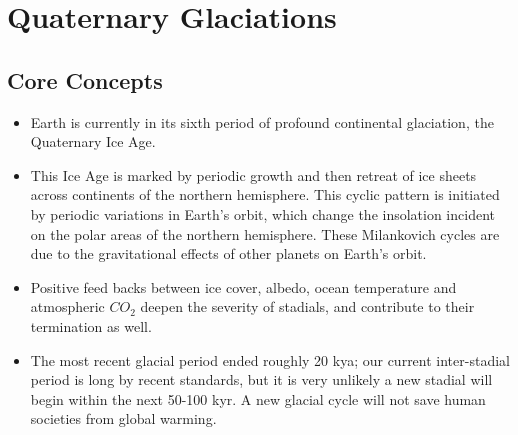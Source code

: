 \chapter{Quaternary Glaciations}\label{chap:Ice_Ages}

\section{Core Concepts}
\begin{itemize}
	\item	Earth is currently in its sixth period of profound continental glaciation, the Quaternary Ice Age.  
	\item This Ice Age is marked by periodic growth and then retreat of ice sheets across continents of the northern hemisphere. This cyclic pattern is initiated by periodic variations in Earth's orbit, which change the insolation incident on the polar areas of the northern hemisphere. These Milankovich cycles are due to the gravitational effects of other planets on Earth's orbit.
	\item Positive feed backs between ice cover, albedo, ocean temperature and atmospheric $CO_2$ deepen the severity of stadials, and contribute to their termination as well. 
	\item The most recent glacial period ended roughly 20 kya; our current inter-stadial period is long by recent standards, but it is very unlikely a new stadial will begin within the next 50-100 kyr. A new glacial cycle will not save human societies from global warming. 
\end{itemize}

